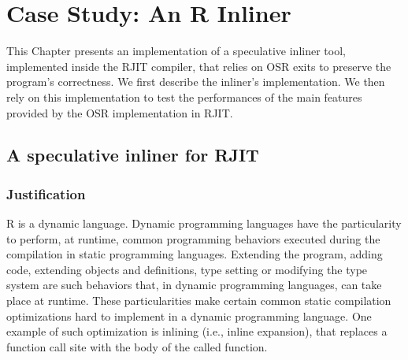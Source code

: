 
\chapter{Case Study: An R Inliner} %

\label{Chapter5} %


\newcommand{\keyword}[1]{\textbf{#1}}
\newcommand{\tabhead}[1]{\textbf{#1}}
\newcommand{\code}[1]{\texttt{#1}}
\newcommand{\file}[1]{\texttt{\bfseries#1}}
\newcommand{\option}[1]{\texttt{\itshape#1}}

This Chapter presents an implementation of a speculative inliner tool, implemented inside the RJIT compiler, that relies on OSR exits to preserve the program's correctness.
We first describe the inliner's implementation.
We then rely on this implementation to test the performances of the main features provided by the OSR implementation in RJIT.\\

\section{A speculative inliner for RJIT}
\subsection{Justification}
R is a dynamic language. 
Dynamic programming languages have the particularity to perform, at runtime, common programming behaviors executed during the compilation in static programming languages.
Extending the program, adding code, extending objects and definitions, type setting or modifying the type system are such behaviors that, in dynamic programming languages, can take place at runtime.
These particularities make certain common static compilation optimizations hard to implement in a dynamic programming language.
One example of such optimization is inlining (i.e., inline expansion), that replaces a function call site with the body of the called function.\\

